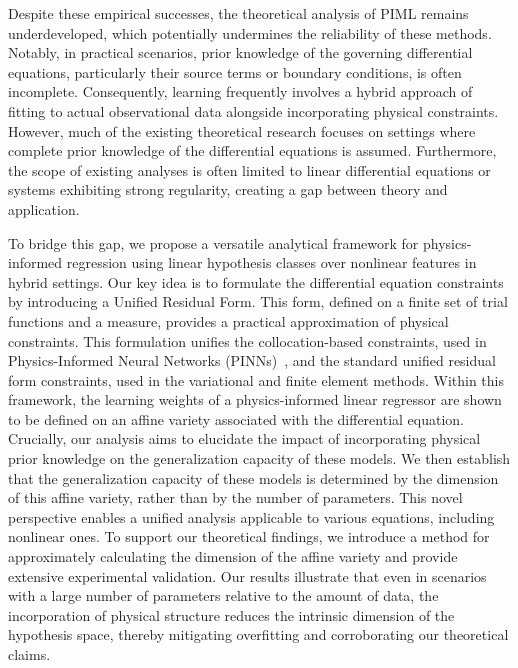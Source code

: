 \documentclass{article}
\theoremstyle{plain}
\theoremstyle{definition}
\theoremstyle{remark}
\begin{document}
Despite these empirical successes, the theoretical analysis of PIML remains underdeveloped, which potentially undermines the reliability of these methods. Notably, in practical scenarios, prior knowledge of the governing differential equations, particularly their source terms or boundary conditions, is often incomplete. Consequently, learning frequently involves a hybrid approach of fitting to actual observational data alongside incorporating physical constraints. However, much of the existing theoretical research focuses on settings where complete prior knowledge of the differential equations is assumed. Furthermore, the scope of existing analyses is often limited to linear differential equations or systems exhibiting strong regularity, creating a gap between theory and application.

To bridge this gap, we propose a versatile analytical framework for physics-informed regression using linear hypothesis classes over nonlinear features in hybrid settings. Our key idea is to formulate the differential equation constraints by introducing a Unified Residual Form. This form, defined on a finite set of trial functions and a measure, provides a practical approximation of physical constraints. This formulation unifies the collocation-based constraints, used in Physics-Informed Neural Networks (PINNs)~\citep{raissi2019physics}, and the standard unified residual form constraints, used in the variational and finite element methods. Within this framework, the learning weights of a physics-informed linear regressor are shown to be defined on an affine variety associated with the differential equation. Crucially, our analysis aims to elucidate the impact of incorporating physical prior knowledge on the generalization capacity of these models. We then establish that the generalization capacity of these models is determined by the dimension of this affine variety, rather than by the number of parameters. This novel perspective enables a unified analysis applicable to various equations, including nonlinear ones. To support our theoretical findings, we introduce a method for approximately calculating the dimension of the affine variety and provide extensive experimental validation. Our results illustrate that even in scenarios with a large number of parameters relative to the amount of data, the incorporation of physical structure reduces the intrinsic dimension of the hypothesis space, thereby mitigating overfitting and corroborating our theoretical claims.

\end{document}
